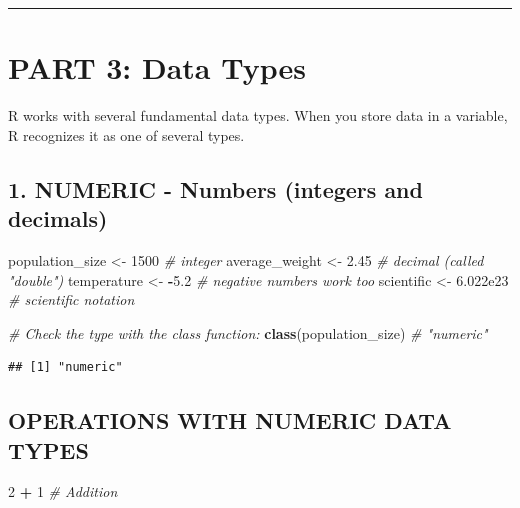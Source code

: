 \documentclass[
]{article}
\newenvironment{Shaded}{\begin{snugshade}}{\end{snugshade}}
\newcommand{\CommentTok}[1]{\textcolor[rgb]{0.56,0.35,0.01}{\textit{#1}}}
\newcommand{\DecValTok}[1]{\textcolor[rgb]{0.00,0.00,0.81}{#1}}
\newcommand{\FloatTok}[1]{\textcolor[rgb]{0.00,0.00,0.81}{#1}}
\newcommand{\FunctionTok}[1]{\textcolor[rgb]{0.13,0.29,0.53}{\textbf{#1}}}
\newcommand{\NormalTok}[1]{#1}
\newcommand{\OtherTok}[1]{\textcolor[rgb]{0.56,0.35,0.01}{#1}}
\newcommand{\SpecialCharTok}[1]{\textcolor[rgb]{0.81,0.36,0.00}{\textbf{#1}}}
\begin{document}
\begin{center}\rule{0.5\linewidth}{0.5pt}\end{center}

\section{PART 3: Data Types}\label{part-3-data-types}

R works with several fundamental data types. When you store data in a
variable, R recognizes it as one of several types.

\subsection{1. NUMERIC - Numbers (integers and
decimals)}\label{numeric---numbers-integers-and-decimals}

\begin{Shaded}
\begin{Highlighting}[]
\NormalTok{population\_size }\OtherTok{\textless{}{-}} \DecValTok{1500}      \CommentTok{\# integer}
\NormalTok{average\_weight }\OtherTok{\textless{}{-}} \FloatTok{2.45}       \CommentTok{\# decimal (called "double")}
\NormalTok{temperature }\OtherTok{\textless{}{-}} \SpecialCharTok{{-}}\FloatTok{5.2}          \CommentTok{\# negative numbers work too}
\NormalTok{scientific }\OtherTok{\textless{}{-}} \FloatTok{6.022e23}       \CommentTok{\# scientific notation }

\CommentTok{\# Check the type with the class function:}
\FunctionTok{class}\NormalTok{(population\_size)  }\CommentTok{\# "numeric"}
\end{Highlighting}
\end{Shaded}

\begin{verbatim}
## [1] "numeric"
\end{verbatim}

\subsection{OPERATIONS WITH NUMERIC DATA
TYPES}\label{operations-with-numeric-data-types}

\begin{Shaded}
\begin{Highlighting}[]
\DecValTok{2} \SpecialCharTok{+} \DecValTok{1}   \CommentTok{\# Addition}
\end{Highlighting}
\end{Shaded}
\end{document}
